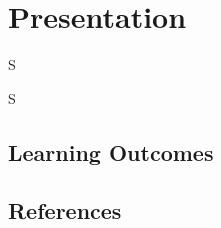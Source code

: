 \frenchspacing
\chapter{Presentation}
\epigraph{S}{S}

%
\section{Learning Outcomes}

%
\section{References}
